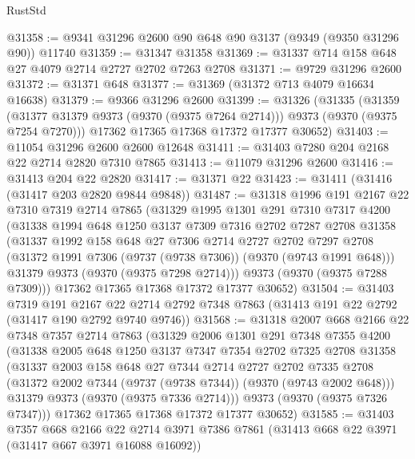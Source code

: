 \begin{lexlean}{RustStd}
\begin{coremodule}
{\begin{coremodule}
{{{{{{{{{{{{{{{{{{{{{{{{{{{{{{{{{{{{{{{@31358 := @9341 @31296 @2600 @90 @648 @90 @3137 (@9349 (@9350 @31296 @90)) @11740
@31359 := @31347 @31358
@31369 := @31337 @714 @158 @648 @27 @4079 @2714 @2727 @2702 @7263 @2708
@31371 := @9729 @31296 @2600
@31372 := @31371 @648
@31377 := @31369 (@31372 @713 @4079 @16634 @16638)
@31379 := @9366 @31296 @2600
@31399 := @31326
    (@31335
      (@31359 (@31377 @31379 @9373 (@9370 (@9375 @7264 @2714))) @9373 (@9370 (@9375 @7254 @7270)))
      @17362
      @17365
      @17368
      @17372
      @17377
      @30652)
@31403 := @11054 @31296 @2600 @2600 @12648
@31411 := @31403 @7280 @204 @2168 @22 @2714 @2820 @7310 @7865
@31413 := @11079 @31296 @2600
@31416 := @31413 @204 @22 @2820
@31417 := @31371 @22
@31423 := @31411 (@31416 (@31417 @203 @2820 @9844 @9848))
@31487 := @31318
    @1996
    @191
    @2167
    @22
    @7310
    @7319
    @2714
    @7865
    (@31329
      @1995
      @1301
      @291
      @7310
      @7317
      @4200
      (@31338
        @1994
        @648
        @1250
        @3137
        @7309
        @7316
        @2702
        @7287
        @2708
        @31358
        (@31337
          @1992
          @158
          @648
          @27
          @7306
          @2714
          @2727
          @2702
          @7297
          @2708
          (@31372 @1991 @7306 (@9737 (@9738 @7306)) (@9370 (@9743 @1991 @648)))
          @31379
          @9373
          (@9370 (@9375 @7298 @2714)))
        @9373
        (@9370 (@9375 @7288 @7309)))
      @17362
      @17365
      @17368
      @17372
      @17377
      @30652)
@31504 := @31403
    @7319
    @191
    @2167
    @22
    @2714
    @2792
    @7348
    @7863
    (@31413 @191 @22 @2792 (@31417 @190 @2792 @9740 @9746))
@31568 := @31318
    @2007
    @668
    @2166
    @22
    @7348
    @7357
    @2714
    @7863
    (@31329
      @2006
      @1301
      @291
      @7348
      @7355
      @4200
      (@31338
        @2005
        @648
        @1250
        @3137
        @7347
        @7354
        @2702
        @7325
        @2708
        @31358
        (@31337
          @2003
          @158
          @648
          @27
          @7344
          @2714
          @2727
          @2702
          @7335
          @2708
          (@31372 @2002 @7344 (@9737 (@9738 @7344)) (@9370 (@9743 @2002 @648)))
          @31379
          @9373
          (@9370 (@9375 @7336 @2714)))
        @9373
        (@9370 (@9375 @7326 @7347)))
      @17362
      @17365
      @17368
      @17372
      @17377
      @30652)
@31585 := @31403
    @7357
    @668
    @2166
    @22
    @2714
    @3971
    @7386
    @7861
    (@31413 @668 @22 @3971 (@31417 @667 @3971 @16088 @16092))
}}}}}}}}}}}}}}}}}}}}}}}}}}}}}}}}}}}}}}}
\end{coremodule}}
\end{coremodule}
\end{lexlean}
